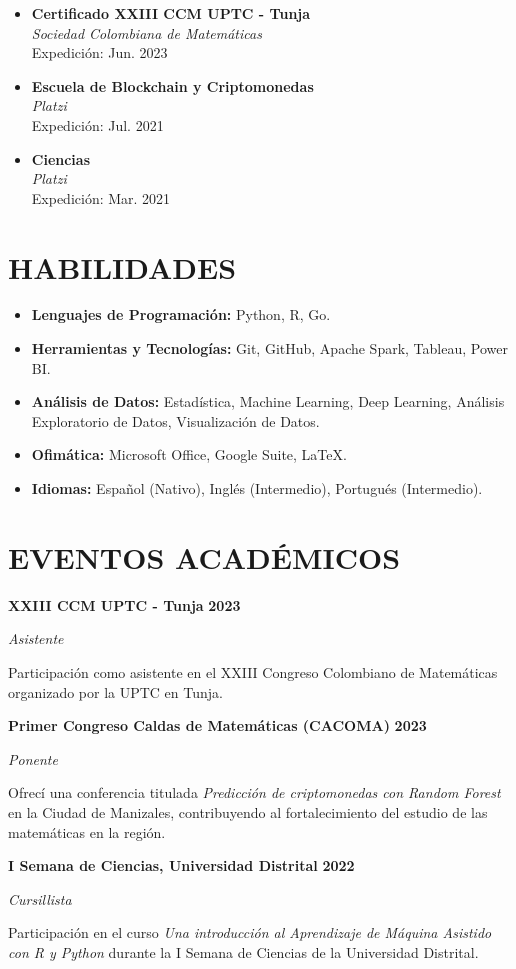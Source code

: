 \documentclass[paper=a4,fontsize=11pt]{scrartcl} %
\newcommand{\sepspace}{\vspace*{0.8em}}
\newcommand{\NewPart}[1]{\section*{\uppercase{#1}}}
\newcommand{\EducationEntry}[4]{%
  \noindent \textbf{#1} \hfill \textbf{#2} \par
  \noindent \textit{#3} \par
  \noindent \small #4 
  \normalsize \par \sepspace
}
\begin{document}
\begin{itemize}[leftmargin=*, noitemsep]
  \item \textbf{Certificado XXIII CCM UPTC - Tunja} \\
        \textit{Sociedad Colombiana de Matemáticas} \\
        Expedición: Jun. 2023

  \item \textbf{Escuela de Blockchain y Criptomonedas} \\
        \textit{Platzi} \\
        Expedición: Jul. 2021 

  \item \textbf{Ciencias} \\
        \textit{Platzi} \\
        Expedición: Mar. 2021 
\end{itemize}

\sepspace

\NewPart{Habilidades}

\begin{itemize}[leftmargin=*, noitemsep]
    \item \textbf{Lenguajes de Programación:} Python, R, Go.
    \item \textbf{Herramientas y Tecnologías:} Git, GitHub, Apache Spark, Tableau, Power BI.
    \item \textbf{Análisis de Datos:} Estadística, Machine Learning, Deep Learning, Análisis Exploratorio de Datos, Visualización de Datos.
    \item \textbf{Ofimática:} Microsoft Office, Google Suite, \LaTeX.
    \item \textbf{Idiomas:} Español (Nativo), Inglés (Intermedio), Portugués (Intermedio).
\end{itemize}

\sepspace

\NewPart{Eventos Académicos}

\EducationEntry{XXIII CCM UPTC - Tunja}{2023}{Asistente}{%
Participación como asistente en el XXIII Congreso Colombiano de Matemáticas organizado por la UPTC en Tunja.
}

\EducationEntry{Primer Congreso Caldas de Matemáticas (CACOMA)}{2023}{Ponente}{%
Ofrecí una conferencia titulada \textit{Predicción de criptomonedas con Random Forest} en la Ciudad de Manizales, contribuyendo al fortalecimiento del estudio de las matemáticas en la región.
}

\EducationEntry{I Semana de Ciencias, Universidad Distrital}{2022}{Cursillista}{%
Participación en el curso \textit{Una introducción al Aprendizaje de Máquina Asistido con R y Python} durante la I Semana de Ciencias de la Universidad Distrital.
}

\sepspace
\end{document}
